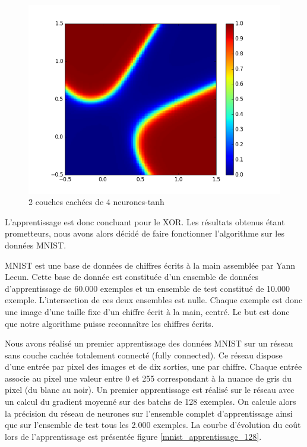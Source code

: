 \begin{figure}[!h]
\begin{center}
\includegraphics[scale=0.6]{images/xor_tanh_2_4.png}
\caption{2 couches cachées de 4 neurones-tanh}
\label{xor_tanh_2_4}
\end{center}
\end{figure}

L'apprentissage est donc concluant pour le XOR. Les résultats obtenus étant prometteurs, nous avons alors décidé de faire fonctionner l'algorithme sur les données MNIST.

MNIST est une base de données de chiffres écrits à la main assemblée par Yann Lecun. Cette base de donnée est constituée d'un ensemble de données d'apprentissage de 60.000 exemples et un ensemble de test constitué de 10.000 exemple. L'intersection de ces deux ensembles est nulle. Chaque exemple est donc une image d'une taille fixe d'un chiffre écrit à la main, centré. Le but est donc que notre algorithme puisse reconnaître les chiffres écrits.

Nous avons réalisé un premier apprentissage des données MNIST sur un réseau sans couche cachée totalement connecté (fully connected). Ce réseau dispose d'une entrée par pixel des images et de dix sorties, une par chiffre. Chaque entrée associe au pixel une valeur entre 0 et 255 correspondant à la nuance de gris du pixel (du blanc au noir). Un premier apprentissage est réalisé sur le réseau avec un calcul du gradient moyenné sur des batchs de 128 exemples. On calcule alors la précision du réseau de neurones sur l'ensemble complet d'apprentissage ainsi que sur l'ensemble de test tous les 2.000 exemples. La courbe d'évolution du coût lors de l'apprentissage est présentée figure \ref{mnist_apprentissage_128}. 

